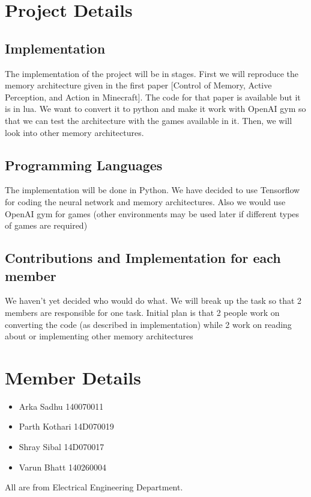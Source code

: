 \documentclass{article}
\begin{document}
\section{Project Details}
\subsection{Implementation}
The implementation of the project will be in stages. First we will reproduce the memory architecture given in the first paper [Control of Memory, Active Perception, and Action in Minecraft]. The code for that paper is available but it is in lua. We want to convert it to python and make it work with OpenAI gym so that we can test the architecture with the games available in it. Then, we will look into other memory architectures.

\subsection{Programming Languages}
The implementation will be done in Python. We have decided to use Tensorflow for coding the neural network and memory architectures. Also we would use OpenAI gym for games (other environments may be used later if different types of games are required)

\subsection{Contributions and Implementation for each member}
We haven't yet decided who would do what. We will break up the task so that 2 members are responsible for one task. Initial plan is that 2 people work on converting the code (as described in implementation) while 2 work on reading about or implementing other memory architectures

\section{Member Details}
\begin{itemize}
\item Arka Sadhu 140070011
\item Parth Kothari 14D070019
\item Shray Sibal 14D070017
\item Varun Bhatt 140260004
\end{itemize}
All are from Electrical Engineering Department.
\end{document}
